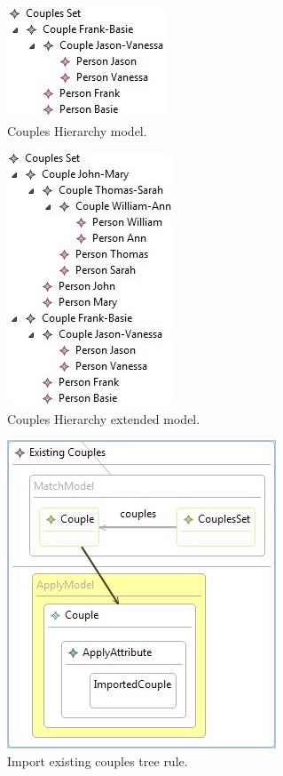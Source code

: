 \begin{figure}[h]
\begin{center}
  \includegraphics[scale=0.7]{imgs/existing_couples_hierarchy.jpg}
  \caption{Couples Hierarchy model.}
  \label{fig:existing_couples_hierarchy}
\end{center}
\end{figure}

\begin{figure}[h]
\begin{center}
  \includegraphics[scale=0.7]{imgs/couples_hierarchy_extended.jpg}
  \caption{Couples Hierarchy extended model.}
  \label{fig:couples_hierarchy_extended}
\end{center}
\end{figure}


\begin{figure}[h]
\begin{center}
  \includegraphics[scale=0.7]{imgs/import_existing_couples.jpg}
  \caption{Import existing couples tree rule.}
  \label{fig:import_existing_couples}
\end{center}
\end{figure}

